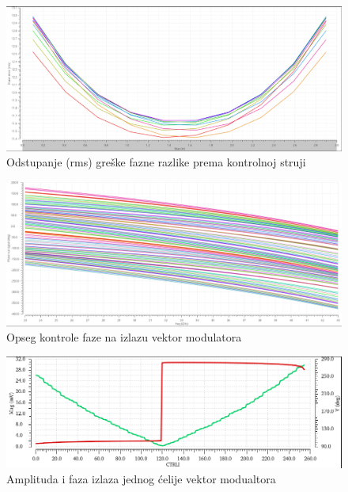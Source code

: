 \documentclass[journal,twocolumn,letterpaper]{IEEEJERM}
\begin{document}
\begin{figure}[!htbp]
  \centering
  \includegraphics[width=\linewidth]{phase_error_rms.png}
  \caption{Odstupanje (rms) greške fazne razlike prema kontrolnoj struji}
  \label{fig:phase_error_rms}
\end{figure}

\begin{figure}[!htbp]
  \centering
  \includegraphics[width=\linewidth]{phase_out_signal.png}
  \caption{Opseg kontrole faze na izlazu vektor modulatora}
  \label{fig:phase_out_signal}
\end{figure}

\begin{figure}[!htbp]
  \centering
  \includegraphics[width=\linewidth]{vga_linearity.png}
  \caption{Amplituda i faza izlaza jednog ćelije vektor modualtora}
  \label{fig:vga_linearity}
\end{figure}

   
\end{document}
